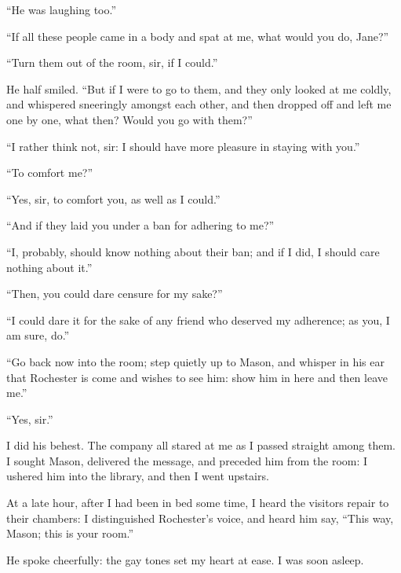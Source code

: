 \enquote{He was laughing too.}

\enquote{If all these people came in a body and spat at me, what would
	you do, Jane?}

\enquote{Turn them out of the room, sir, if I could.}

He half smiled. \enquote{But if I were to go to them, and they only
	looked at me coldly, and whispered sneeringly amongst each other, and
	then dropped off and left me one by one, what then? Would you go with
	them?}

\enquote{I rather think not, sir: I should have more pleasure in staying
	with you.}

\enquote{To comfort me?}

\enquote{Yes, sir, to comfort you, as well as I could.}

\enquote{And if they laid you under a ban for adhering to me?}

\enquote{I, probably, should know nothing about their ban; and if I did,
	I should care nothing about it.}

\enquote{Then, you could dare censure for my sake?}

\enquote{I could dare it for the sake of any friend who deserved my
	adherence; as you, I am sure, do.}

\enquote{Go back now into the room; step quietly up to Mason, and
	whisper in his ear that \Mr{} Rochester is come and wishes to see him:
	show him in here and then leave me.}

\enquote{Yes, sir.}

I did his behest. The company all stared at me as I passed straight
among them. I sought \Mr{} Mason, delivered the message, and preceded him
from the room: I ushered him into the library, and then I went upstairs.

At a late hour, after I had been in bed some time, I heard the visitors
repair to their chambers: I distinguished \Mr{} Rochester's voice, and
heard him say, \enquote{This way, Mason; this is your room.}

He spoke cheerfully: the gay tones set my heart at ease. I was soon
asleep.
